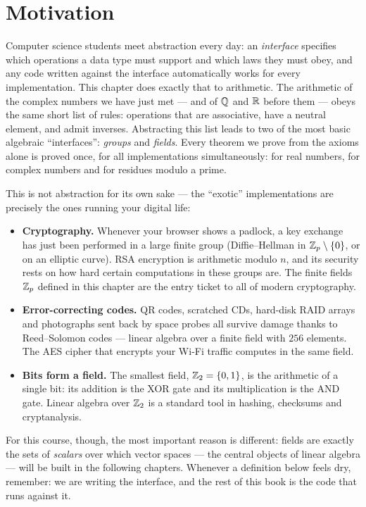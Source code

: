 \section{Motivation}

Computer science students meet abstraction every day: an \emph{interface} specifies which operations a
data type must support and which laws they must obey, and any code written against the interface
automatically works for every implementation. This chapter does exactly that to arithmetic. The arithmetic
of the complex numbers we have just met — and of $\mathbb{Q}$ and $\mathbb{R}$ before them — obeys the same short list of
rules: operations that are associative, have a neutral element, and admit inverses. Abstracting this list
leads to two of the most basic algebraic ``interfaces'': \emph{groups} and \emph{fields}. Every theorem we
prove from the axioms alone is proved once, for all implementations simultaneously: for real numbers, for
complex numbers and for residues modulo a prime.

This is not abstraction for its own sake — the ``exotic'' implementations are precisely the ones running
your digital life:

\begin{itemize}
\item \textbf{Cryptography.} Whenever your browser shows a padlock, a key exchange has just been performed
in a large finite group (Diffie--Hellman in $\mathbb{Z}_p\setminus\{0\}$, or on an elliptic curve). RSA encryption
is arithmetic modulo $n$, and its security rests on how hard certain computations in these groups are. The
finite fields $\mathbb{Z}_p$ defined in this chapter are the entry ticket to all of modern cryptography.
\item \textbf{Error-correcting codes.} QR codes, scratched CDs, hard-disk RAID arrays and photographs sent
back by space probes all survive damage thanks to Reed--Solomon codes — linear algebra over a finite field
with $256$ elements. The AES cipher that encrypts your Wi-Fi traffic computes in the same field.
\item \textbf{Bits form a field.} The smallest field, $\mathbb{Z}_2=\{0,1\}$, is the arithmetic of a single bit:
its addition is the XOR gate and its multiplication is the AND gate. Linear algebra over $\mathbb{Z}_2$ is a
standard tool in hashing, checksums and cryptanalysis.
\end{itemize}

For this course, though, the most important reason is different: fields are exactly the sets of
\emph{scalars} over which vector spaces — the central objects of linear algebra — will be built in the
following chapters. Whenever a definition below feels dry, remember: we are writing the interface, and the
rest of this book is the code that runs against it.

